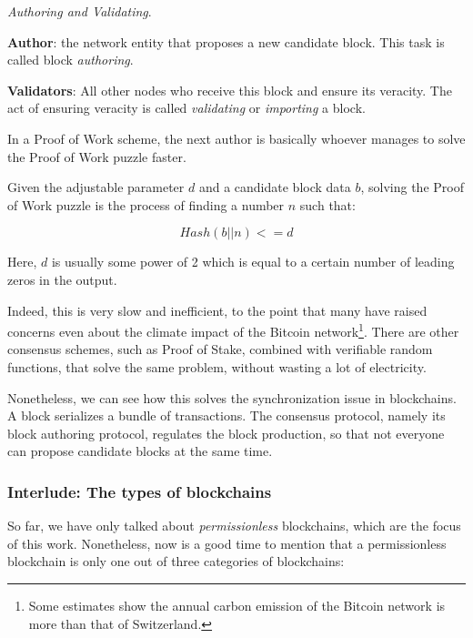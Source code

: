 \begin{definition} \label{def:auhtor_validator}

	\textit{Authoring and Validating}.

	\textbf{Author}: the network entity that proposes a new candidate block. This task is called
	block \textit{authoring}.

	\textbf{Validators}: All other nodes who receive this block and ensure its veracity. The act of
	ensuring veracity is called \textit{validating} or \textit{importing} a block.
\end{definition}

In a Proof of Work scheme, the next author is basically whoever manages to solve the Proof of Work
puzzle faster.

\begin{definition} \label{def:pow} Given the adjustable parameter $d$ and a candidate block data
$b$, solving the Proof of Work puzzle is the process of finding a number $n$ such that:

	\begin{equation}
		Hash(b || n) <= d
	\end{equation}

Here, $d$ is usually some power of 2 which is equal to a certain number of leading zeros in the
output.
\end{definition}

Indeed, this is very slow and inefficient, to the point that many have raised concerns even about
the climate impact of the Bitcoin network\footnote{Some estimates show the annual carbon emission of
the Bitcoin network is more than that of Switzerland\cite{stollCarbonFootprintBitcoin2019}.}. There
are other consensus schemes, such as Proof of Stake, combined with verifiable random functions, that
solve the same problem, without wasting a lot of electricity.

Nonetheless, we can see how this solves the synchronization issue in blockchains. A block serializes
a bundle of transactions. The consensus protocol, namely its block authoring protocol, regulates the
block production, so that not everyone can propose candidate blocks at the same time.

\subsubsection{Interlude: The types of blockchains}

So far, we have only talked about \textit{permissionless} blockchains, which are the focus of this
work. Nonetheless, now is a good time to mention that a permissionless blockchain is only one out of
three categories of blockchains:

